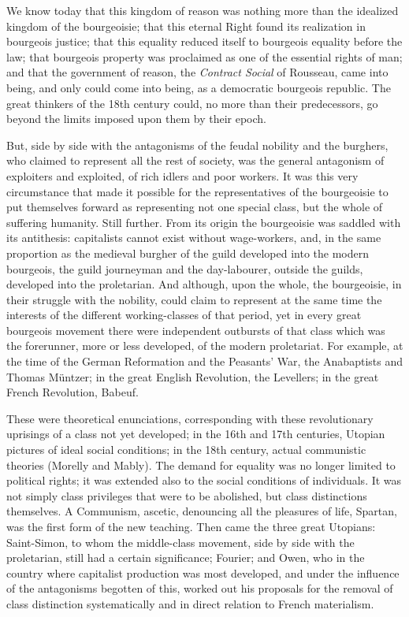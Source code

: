 We know today that this kingdom of reason was nothing more than the idealized
kingdom of the bourgeoisie; that this eternal Right found its realization in
bourgeois justice; that this equality reduced itself to bourgeois equality
before the law; that bourgeois property was proclaimed as one of the essential
rights of man; and that the government of reason, the \emph{Contract Social} of
Rousseau, came into being, and only could come into being, as a democratic
bourgeois republic. The great thinkers of the 18th century could, no more than
their predecessors, go beyond the limits imposed upon them by their epoch.

But, side by side with the antagonisms of the feudal nobility and the burghers,
who claimed to represent all the rest of society, was the general antagonism of
exploiters and exploited, of rich idlers and poor workers. It was this very
circumstance that made it possible for the representatives of the bourgeoisie to
put themselves forward as representing not one special class, but the whole of
suffering humanity. Still further. From its origin the bourgeoisie was saddled
with its antithesis: capitalists cannot exist without wage-workers, and, in the
same proportion as the medieval burgher of the guild developed into the modern
bourgeois, the guild journeyman and the day-labourer, outside the guilds,
developed into the proletarian. And although, upon the whole, the bourgeoisie,
in their struggle with the nobility, could claim to represent at the same time
the interests of the different working-classes of that period, yet in every
great bourgeois movement there were independent outbursts of that class which
was the forerunner, more or less developed, of the modern proletariat. For
example, at the time of the German Reformation and the Peasants' War, the
Anabaptists and Thomas Müntzer; in the great English Revolution, the Levellers;
in the great French Revolution, Babeuf.

These were theoretical enunciations, corresponding with these revolutionary
uprisings of a class not yet developed; in the 16th and 17th centuries, Utopian
pictures of ideal social conditions; in the 18th century, actual communistic
theories (Morelly and Mably). The demand for equality was no longer limited to political rights; it was
extended also to the social conditions of individuals. It was not simply class
privileges that were to be abolished, but class distinctions themselves. A
Communism, ascetic, denouncing all the pleasures of life, Spartan, was the first
form of the new teaching. Then came the three great Utopians: Saint-Simon, to
whom the middle-class movement, side by side with the proletarian, still had a
certain significance; Fourier; and Owen, who in the country where capitalist
production was most developed, and under the influence of the antagonisms
begotten of this, worked out his proposals for the removal of class distinction
systematically and in direct relation to French materialism.

